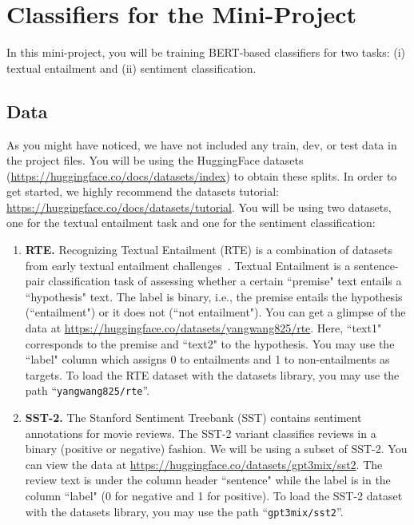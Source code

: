 \section{Classifiers for the Mini-Project}
In this mini-project, you will be training BERT-based classifiers for two tasks: (i) textual entailment and (ii) sentiment classification.



\subsection{Data}
As you might have noticed, we have not included any train, dev, or test data in the project files. You will be using the HuggingFace datasets (\url{https://huggingface.co/docs/datasets/index}) to obtain these splits. In order to get started, we highly recommend the datasets tutorial: \url{https://huggingface.co/docs/datasets/tutorial}. You will be using two datasets, one for the textual entailment task and one for the sentiment classification:
\begin{enumerate}
    \item \textbf{RTE.} Recognizing Textual Entailment (RTE) is a combination of datasets from early textual entailment challenges~\cite[earliest being][]{dagan2005pascal}. Textual Entailment is a sentence-pair classification task of assessing whether a certain ``premise" text entails a ``hypothesis" text. The label is binary, i.e., the premise entails the hypothesis (``entailment") or it does not (``not entailment"). You can get a glimpse of the data at \url{https://huggingface.co/datasets/yangwang825/rte}. Here, ``text1" corresponds to the premise and ``text2" to the hypothesis. You may use the ``label" column which assigns 0 to entailments and 1 to non-entailments as targets. To load the RTE dataset with the datasets library, you may use the path ``\texttt{yangwang825/rte}''.
    \item \textbf{SST-2.} The Stanford Sentiment Treebank (SST) \cite{socher-etal-2013-recursive} contains sentiment annotations for movie reviews. The SST-2 variant classifies reviews in a binary (positive or negative) fashion. We will be using a subset of SST-2. You can view the data at \url{https://huggingface.co/datasets/gpt3mix/sst2}. The review text is under the column header ``sentence" while the label is in the column ``label" (0 for negative and 1 for positive). To load the SST-2 dataset with the datasets library, you may use the path ``\texttt{gpt3mix/sst2}''.
\end{enumerate}

